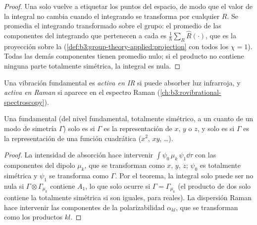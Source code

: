 \begin{proof}
Una  solo vuelve a etiquetar los puntos del espacio, de modo que el valor de la
integral no cambia cuando el integrando se transforma por cualquier $R$. Se promedia
el integrando transformado sobre el grupo: el promedio de las componentes del
integrando que pertenecen a cada  es
$\frac1h\sum_R\hat R(\cdot)$, que es la proyección sobre la  (\cref{def:b3:group-theory-applied:projection} con todos los
$\chi = 1$). Todas las demás componentes tienen promedio nulo; si el producto no contiene ninguna
parte totalmente simétrica, la integral es nula.
\end{proof}

\begin{definition}\label{def:b3:group-theory-applied:activity}
Una vibración fundamental es \emph{activa en IR} si puede absorber
luz infrarroja, y \emph{activa en Raman} si aparece en el
espectro Raman (\cref{ch:b3:rovibrational-spectroscopy}).
\end{definition}

\begin{corollary}\label{cor:b3:group-theory-applied:ir-raman}
Una fundamental (del nivel fundamental, totalmente simétrico, a un cuanto
de un modo de simetría $\Gamma$) solo es  si $\Gamma$ es la
representación de $x$, $y$ o $z$, y solo es  si $\Gamma$ es la
representación de una función cuadrática ($x^2$, $xy$, \dots).
\end{corollary}

\begin{proof}
La intensidad de absorción hace intervenir $\int\psi_0\,\mu_k\,\psi_1\dd\tau$ con las componentes
del dipolo $\mu_k$, que se transforman como $x$, $y$, $z$; $\psi_0$ es totalmente simétrica
y $\psi_1$ se transforma como $\Gamma$. Por el teorema, la integral solo puede ser no nula
si $\Gamma\otimes\Gamma_{\mu_k}$ contiene $A_1$, lo que solo ocurre si $\Gamma =
\Gamma_{\mu_k}$ (el producto de dos  solo contiene la
totalmente simétrica si son iguales, para  reales). La dispersión Raman
hace intervenir las componentes de la polarizabilidad $\alpha_{kl}$, que se
transforman como los productos $kl$.
\end{proof}

